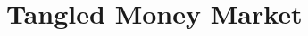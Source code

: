 \documentclass[review]{elsarticle}
\begin{document}
\section{Tangled Money Market}






\end{document}
